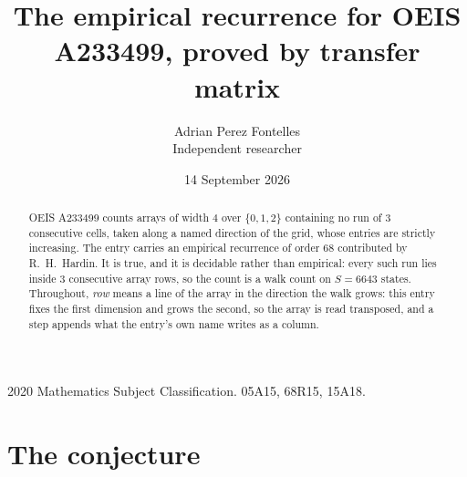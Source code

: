 \documentclass[11pt,a4paper]{article}
\title{The empirical recurrence for OEIS A233499, proved by transfer matrix}
\author{Adrian Perez Fontelles\\ \small Independent researcher}
\date{14 September 2026}
\theoremstyle{plain}
\theoremstyle{definition}
\begin{document}
\maketitle

\begin{abstract}
OEIS A233499 counts arrays of width $4$ over $\{0,1,2\}$ containing no run of $3$ consecutive
cells, taken along a named direction of the grid, whose entries are strictly increasing. The entry carries
an empirical recurrence of order $68$ contributed by R.~H.~Hardin. It is true, and it is
decidable rather than empirical: every such run lies inside $3$ consecutive array rows, so
the count is a walk count on $S=6643$ states.
 Throughout, \emph{row} means a line of the array in the direction the walk grows: this entry fixes the first dimension and grows the second, so the array is read transposed, and a step appends what the entry's own name writes as a column.\end{abstract}

\noindent\small 2020 Mathematics Subject Classification. 05A15, 68R15, 15A18.\normalsize

\section{The conjecture}
\end{document}
